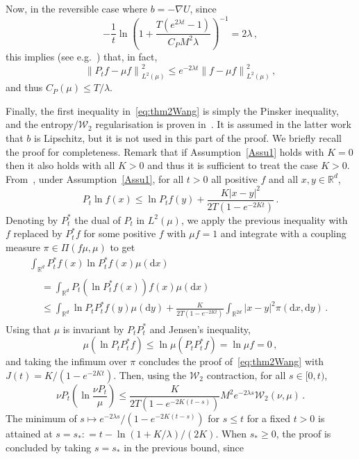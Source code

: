 \documentclass[10pt]{amsart}
\theoremstyle{definition}\newtheorem{defi}[theo]{Definition}\newtheorem{rema}[theo]{Remark}\newtheorem{exam}[theo]{Example}\newtheorem{exem}[theo]{Example}\newtheorem{nota}[theo]{Notation}
\newcommand{\R}{\mathbb R}
\newcommand{\clW}{\mathcal W}
\newcommand{\dd}{\mathrm{d}}
\newcommand{\na}{\nabla}
\newcommand{\1}{\mathbbm{1}}
\newcommand{\nv}[1]{#1}
\begin{document}
Now, in the reversible case where $b=-\na U$, since
\[
- \frac1t \ln \left( 1+ \nv{\frac{T\left(e^{2\lambda t}-1\right)}{C_PM^2\lambda}}\right)^{-1} = 2\lambda\,,
\]
this implies (see e.g.~\cite[\nv{Lemma 2.14}]{CattiauxGuillinPAZ}) that, in fact,
\[
\left\|P_t f - \mu f\right\|_{L^2(\mu)}^2 \leqslant e^{-2\lambda t} \left\|f-\mu f\right\|_{L^2(\mu)}^2\,,
\]
and thus $C_P(\mu)\leqslant T/\lambda$.

Finally, the first inequality in~\eqref{eq:thm2Wang} is simply the Pinsker inequality, and the entropy/$\clW_2$ regularisation is proven in~\cite{RocknerWang}. It is assumed in the latter work that $b$ is Lipschitz, but it is not used in this part of the proof. We briefly recall the proof for completeness. Remark that if Assumption~\ref{Assu1} holds with $K=0$ then it also holds with all $K>0$ and thus it is sufficient to treat the case $K>0$. From~\cite[Theorem~3.3]{Wang}, under Assumption~\ref{Assu1}, for all $t>0$ all positive $f$ and all $x,y\in\R^d$,
\[
P_t \ln f(x) \leqslant \ln P_t f(y) + \frac{K|x-y|^2}{2T\left(1-e^{-2Kt}\right)} \,.
\]
Denoting by $P_t^*$ the dual of $P_t$ in $L^2(\mu)$, we apply the previous inequality with $f$ replaced by $P_t^* f$ for some positive $f$ with $\mu f= 1$ and integrate with a coupling measure $\pi \in \Pi(f\mu, \mu)$ to get
\begin{multline*}
\int_{\R^d} P_t^* f(x) \ln P_t^* f(x) \mu(\dd x)\\
\begin{aligned}
& = \int_{\R^d} P_t\left( \ln P_t^* f(x) \right) f(x) \mu(\dd x)\\
& \leqslant \int_{\R^d} \ln P_t P_t^* f(y) \mu(\dd y) + \frac{K}{2T\left(1-e^{-2Kt}\right)} \int_{\R^{2d}} |x-y|^2 \pi(\dd x,\dd y) \,.
\end{aligned}
\end{multline*}
Using that $\mu$ is invariant by $P_t P_t^*$ and Jensen's inequality,
\[
\mu\left(\ln P_tP_t^* f\right) \leqslant \ln \mu\left(P_tP_t^* f\right) = \ln \mu f = 0\,,
\]
and taking the infimum over $\pi$ concludes the proof of~\eqref{eq:thm2Wang} with $J(t) = K/(1-e^{-2Kt})$. Then, using the $\clW_2$ contraction, for all $s\in[0,t)$,
\[
\nu P_{t} \left( \ln \frac{\nu P_{t}}{\mu}\right) \leqslant \frac{K}{2T(1-e^{-2K(t-s)})} M^2 e^{-2\lambda s} \clW_2(\nu,\mu)\,.
\]
The minimum of $s\mapsto e^{-2\lambda s} /(1-e^{-2K(t-s)})$ for $s \leqslant t$ for a fixed $t>0$ is attained at $s = s_*: = t - \ln \left( 1+K/\lambda\right)/(2K)$. When $s_*\geqslant 0$, the proof is concluded by taking $s=s_*$ in the previous bound, since
\end{document}
